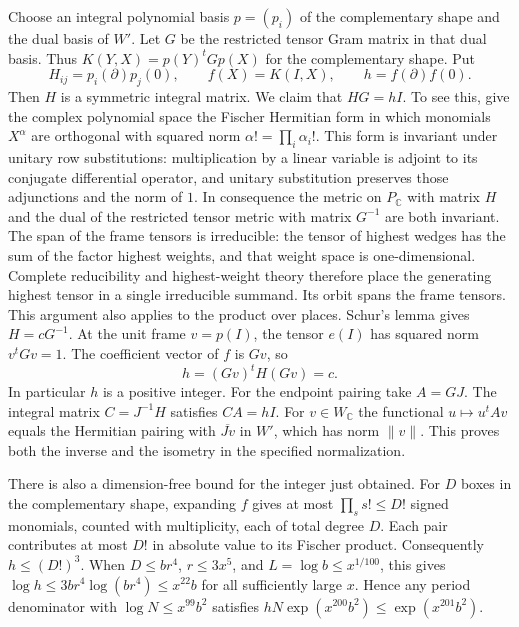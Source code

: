 Choose an integral polynomial basis $p=(p_i)$ of the complementary shape and the dual basis of $W'$. Let $G$ be the restricted tensor Gram matrix in that dual basis. Thus $K(Y,X)=p(Y)^tG p(X)$ for the complementary shape. Put
\[
 H_{ij}=p_i(\partial)p_j(0),\qquad
 f(X)=K(I,X),\qquad h=f(\partial)f(0).
\]
Then $H$ is a symmetric integral matrix. We claim that $HG=hI$. To see this, give the complex polynomial space the Fischer Hermitian form in which monomials $X^\alpha$ are orthogonal with squared norm $\alpha!=\prod_i\alpha_i!$. This form is invariant under unitary row substitutions: multiplication by a linear variable is adjoint to its conjugate differential operator, and unitary substitution preserves those adjunctions and the norm of $1$. In consequence the metric on $P_{\mathbb C}$ with matrix $H$ and the dual of the restricted tensor metric with matrix $G^{-1}$ are both invariant. The span of the frame tensors is irreducible: the tensor of highest wedges has the sum of the factor highest weights, and that weight space is one-dimensional. Complete reducibility and highest-weight theory therefore place the generating highest tensor in a single irreducible summand. Its orbit spans the frame tensors. This argument also applies to the product over places. Schur's lemma gives $H=cG^{-1}$. At the unit frame $v=p(I)$, the tensor $e(I)$ has squared norm $v^tGv=1$. The coefficient vector of $f$ is $Gv$, so
\[
 h=(Gv)^t H(Gv)=c.
\]
In particular $h$ is a positive integer. For the endpoint pairing take $A=GJ$. The integral matrix $C=J^{-1}H$ satisfies $CA=hI$. For $v\in W_{\mathbb C}$ the functional $u\mapsto u^tAv$ equals the Hermitian pairing with $\overline{Jv}$ in $W'$, which has norm $\|v\|$. This proves both the inverse and the isometry in the specified normalization.

There is also a dimension-free bound for the integer just obtained. For $D$ boxes in the complementary shape, expanding $f$ gives at most $\prod_s s!\le D!$ signed monomials, counted with multiplicity, each of total degree $D$. Each pair contributes at most $D!$ in absolute value to its Fischer product. Consequently $h\le(D!)^3$. When $D\le br^4$, $r\le3x^5$, and $L=\log b\le x^{1/100}$, this gives $\log h\le3br^4\log(br^4)\le x^{22}b$ for all sufficiently large $x$. Hence any period denominator with $\log N\le x^{99}b^2$ satisfies $hN\exp(x^{200}b^2)\le\exp(x^{201}b^2)$.

